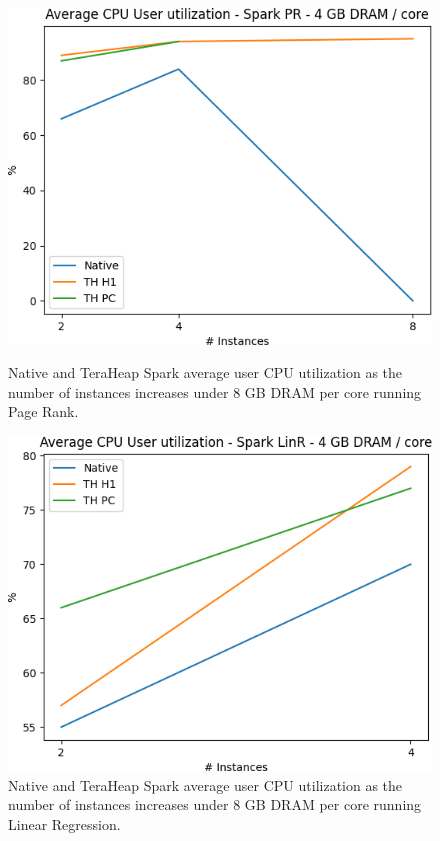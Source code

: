 \begin{figure}[thbp]
        \centering
        \includegraphics[width=\linewidth]{./fig/PR_64_USR.png}
    \caption{Native and TeraHeap Spark average user CPU utilization
        as the number of instances increases under 8 GB DRAM per core running Page Rank.}
                \label{fig:pr_64_usr}

        \includegraphics[width=\linewidth]{./fig/LINR_64_USR.png}
    \caption{Native and TeraHeap Spark average user CPU utilization
        as the number of instances increases under 8 GB DRAM per core running Linear Regression.}
                \label{fig:linr_64_usr}
\end{figure}

